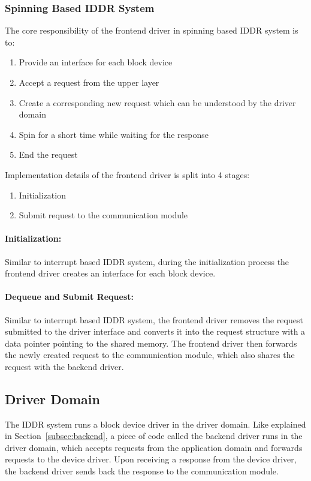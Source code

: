 \subsubsection*{Spinning Based IDDR System}
The core responsibility of the frontend driver in spinning based IDDR system is to:
\begin{enumerate}
\item Provide an interface for each block device
\item Accept a request from the upper layer
\item Create a corresponding new request which can be understood by the driver domain
\item Spin for a short time while waiting for the response
\item End the request
\end{enumerate}

Implementation details of the frontend driver is split into 4 stages:
\begin{enumerate}
\item Initialization
\item Submit request to the communication module
\end{enumerate}

\paragraph{Initialization:}
Similar to interrupt based IDDR system, during the initialization process the frontend driver creates an interface for each block device.

\paragraph{Dequeue and Submit Request:}
Similar to interrupt based IDDR system, the frontend driver removes the request submitted to the driver interface and converts it into the request structure with a data pointer pointing to the shared memory. The frontend driver then forwards the newly created request to the communication module, which also shares the request with the backend driver.

\subsection{Driver Domain}
The IDDR system runs a block device driver in the driver domain. Like explained in Section~\ref{subsec:backend}, a piece of code called the backend driver runs in the driver domain, which accepts requests from the application domain and forwards requests to the device driver. Upon receiving a response from the device driver, the backend driver sends back the response to the communication module.

